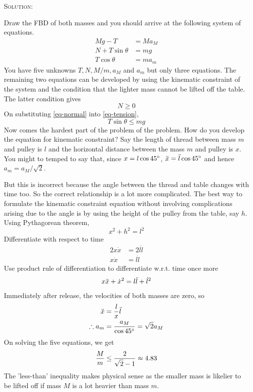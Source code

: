 \begin{enumerate}
\textsc{Solution:}

Draw the FBD of both masses and you should arrive at the following system of equations.
\begin{align}
    Mg - T &= Ma_M\\
    N+T\sin\theta &= mg     \label{eq-tension}\\ 
    T\cos\theta &= ma_m
\end{align}
You have five unknowns $T, N, M/m, a_M$ and $a_m$ but only three equations. The remaining two equations can be developed by using the kinematic constraint of the system and the condition that the lighter mass cannot be lifted off the table. The latter condition gives
\begin{equation}
    N \geq 0 \label{eq-normal}
\end{equation}
On substituting \eqref{eq-normal} into \eqref{eq-tension},
\begin{equation}
    T\sin\theta \leq mg
\end{equation}
Now comes the hardest part of the problem of the problem. How do you develop the equation for kinematic constraint? Say the length of thread between mass $m$ and pulley is $l$ and the horizontal distance between the mass $m$ and pulley is $x$. You might to temped to say that, since $x = l \cos 45\degree$, $\Ddot{x} = \Ddot{l}\cos 45\degree$ and hence $a_m = a_M/\sqrt{2}$.

But this is incorrect because the angle between the thread and table changes with time too. So the correct relationship is a lot more complicated. The best way to formulate the kinematic constraint equation without involving complications arising due to the angle is by using the height of the pulley from the table, say $h$. Using Pythagorean theorem,
\begin{equation*}
    x^2 + h^2 = l^2
\end{equation*}
Differentiate with respect to time
\begin{align*}
    2x\Dot{x} &= 2l\Dot{l}\\
    x\Dot{x} &= l\Dot{l}
\end{align*}
Use product rule of differentiation to differentiate w.r.t. time once more
\begin{equation*}
    x\Ddot{x} + \Dot{x}^2 = l\Ddot{l} + \Dot{l}^2
\end{equation*}
Immediately after release, the velocities of both masses are zero, so
\begin{align}
    \Ddot{x} &= \frac{\displaystyle l}{\displaystyle x} \Ddot{l} \nonumber \\
    \therefore a_m &= \frac{a_M}{\cos 45\degree} = \sqrt{2}a_M
\end{align}
On solving the five equations, we get
\begin{equation*}
    \frac{M}{m} \leq \frac{\displaystyle 2}{\displaystyle \sqrt{2} - 1} \approx 4.83
\end{equation*}
The 'less-than' inequality makes physical sense as the smaller mass is likelier to be lifted off if mass $M$ is a lot heavier than mass $m$.


\end{enumerate}
